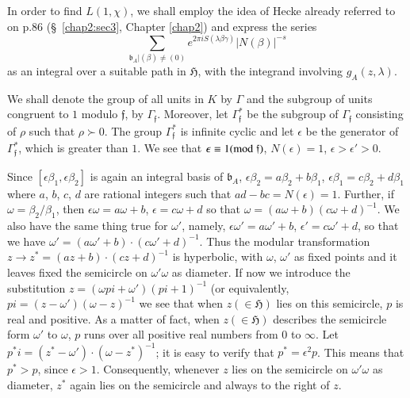 In order to find $L(1,\chi)$, we shall employ the idea of Hecke
already referred to on p.\@ 86 (\S\ \ref{chap2:sec3}, Chapter
\ref{chap2}) and express the 
series 
$$\sum\limits_{\mathfrak{b}_{A}|(\beta)\neq (0)}e^{2\pi
  iS(\lambda\beta\gamma)}|N(\beta)|^{-s}$$ 
as an integral over a
suitable path in $\mathfrak{H}$, with the integrand involving
$g_{A}(z,\lambda)$.

We shall denote the group of all units in $K$ by $\Gamma$ and the
subgroup of units congruent to $1$ modulo $\mathfrak{f}$, by
$\Gamma_{\mathfrak{f}}$. Moreover, let $\Gamma^{\ast}_{\mathfrak{f}}$
be the subgroup of $\Gamma_{\mathfrak{f}}$ consisting of $\rho$ such
that $\rho \succ 0$. The group $\Gamma^{\ast}_{\mathfrak{f}}$ is infinite
cyclic and let $\epsilon$ be the generator of
$\Gamma^{\ast}_{\mathfrak{f}}$, which is greater than $1$. We see that
$\epsilon\equiv 1(\rm{mod} \;\mathfrak{f})$, $N(\epsilon)=1$,
$\epsilon>\epsilon'>0$.

Since $[\epsilon\beta_{1},\epsilon\beta_{2}]$ is again an integral
basis of $\mathfrak{b}_{A}$,
$\epsilon\beta_{2}=a\beta_{2}+b\beta_{1}$,
$\epsilon\beta_{1}=c\beta_{2}+d\beta_{1}$ where $a$, $b$, $c$, $d$ are
rational integers such that $ad-bc=N(\epsilon)=1$. Further, if
$\omega=\beta_{2}/\beta_{1}$, then $\epsilon\omega=a\omega+b$,
$\epsilon=c\omega+d$ so that $\omega=(a\omega+b)(c\omega+d)^{-1}$. We
also have the same thing true for $\omega'$, namely,
$\epsilon\omega'=a\omega'+b$, $\epsilon'=c\omega'+d$, so that we have
$\omega'=(a\omega'+b)\cdot (c\omega'+d)^{-1}$. Thus the modular
transformation $z\to z^{\ast}=(az+b)\cdot (cz+d)^{-1}$ is hyperbolic,
with $\omega$, $\omega'$ as fixed points and it leaves fixed the
semicircle on $\omega'\omega$ as diameter. If now we introduce the
substitution $z=(\omega pi+\omega')(pi+1)^{-1}$ (or equivalently,
$pi=(z-\omega')(\omega-z)^{-1}$ we see that when $z(\in\mathfrak{H})$
lies on this semicircle, $p$ is real and positive. As a matter of
fact, when $z(\in\mathfrak{H})$ describes the semicircle form
$\omega'$ to $\omega$, $p$ runs over all positive real numbers from
$0$ to $\infty$. Let $p^{\ast}i=(z^{\ast}-\omega')\cdot
(\omega-z^{\ast})^{-1}$; it is easy to verify that
$p^{\ast}=\epsilon^{2}p$. This means that $p^{\ast}>p$, since
$\epsilon>1$. Consequently, whenever $z$ lies on the semicircle on
$\omega'\omega$ as diameter, $z^{\ast}$ again lies on the semicircle
and always to the right of $z$.


